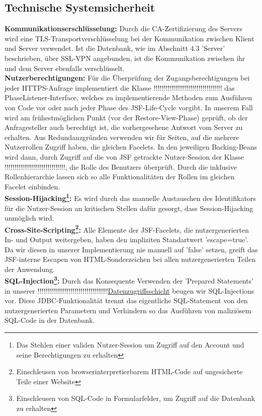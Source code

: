 \documentclass{article}
\begin{document}
\subsection{Technische Systemsicherheit}
\noindent \textbf{Kommunikationserschlüsselung:} Durch die CA-Zertifizierung des Servers wird eine TLS-Transportverschlüsselung bei der Kommunikation zwischen Klient und Server verwendet. Ist die Datenbank, wie im Abschnitt 4.3  'Server' beschrieben, über SSL-VPN angebunden, ist die Kommunikation zwischen ihr und dem Server ebenfalls verschlüsselt. \\
\textbf{Nutzerberechtigungen:} Für die Überprüfung der Zugangsberechtigungen bei jeder HTTPS-Anfrage implementiert die Klasse !!!!!!!!!!!!!!!!!!!!!!!!!!!!!!!!!!!\hyperlink{}{} das PhaseListener-Interface, welches zu implementierende Methoden zum Ausführen von Code vor oder nach jeder Phase des JSF-Life-Cycle vorgibt. In unserem Fall wird am frühestmöglichen Punkt (vor der Restore-View-Phase) geprüft, ob der Anfragesteller auch berechtigt ist, die vorhergesehene Antwort vom Server zu erhalten. Aus Redundanzgründen verwenden wir für Seiten, auf die mehrere Nutzerrollen Zugriff haben, die gleichen Facelets. In den jeweiligen Backing-Beans wird dann, durch Zugriff auf die von JSF getrackte Nutzer-Session der Klasse  !!!!!!!!!!!!!!!!!!!!!!!!!!!!!!!\hyperlink{}{}, die Rolle des Benutzers überprüft. Durch die inklusive Rollenhierarchie lassen sich so alle Funktionalitäten der Rollen im gleichen Facelet einbinden.\\
\textbf{Session-Hijacking\footnote{Das Stehlen einer validen Nutzer-Session um Zugriff auf den Account und seine Berechtigungen zu erhalten}:} Es wird durch das manuelle Austauschen des Identifikators für die Nutzer-Session an kritischen Stellen dafür gesorgt, dass Session-Hijacking unmöglich wird. \\
\textbf{Cross-Site-Scripting\footnote{Einschleusen von browserinterpretierbarem HTML-Code auf ungesicherte Teile einer Website}:} Alle Elemente der JSF-Facelets, die nutzergenerierten In- und Output weitergeben, haben den impliziten Standartwert 'escape=true'. Da wir diesen in unserer Implementierung nie manuell auf 'false' setzen, greift das JSF-interne Escapen von HTML-Sonderzeichen bei allen nutzergenerierten Teilen der Anwendung. \\
\textbf{SQL-Injection\footnote{Einschleusen von SQL-Code in Formularfelder, um Zugriff auf die Datenbank zu erhalten}:} Durch das Konsequente Verwenden der 'Prepared Statements' in unserer !!!!!!!!!!!!!!!!!!!!!!!!!!!!!!!!!!!!\hyperlink{}{Datenzugriffsschicht} beugen wir SQL-Injections vor. Diese JDBC-Funktionalität trennt das eigentliche SQL-Statement von den nutzergenerierten Parametern und Verhindern so das Ausführen von maliziösem SQL-Code in der Datenbank. \\
\end{document}
